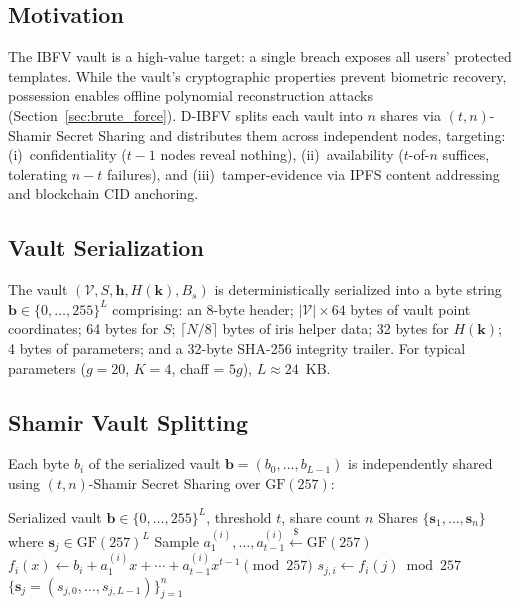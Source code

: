 \documentclass[3p,twocolumn]{elsarticle}
\newcommand{\IBFV}{\textsf{IBFV}}
\newcommand{\DIBFV}{\textsf{D-IBFV}}
\begin{document}
\subsection{Motivation}
\label{sec:decentral_motivation}

The \IBFV{} vault is a high-value target: a single breach exposes all users' protected templates. While the vault's cryptographic properties prevent biometric recovery, possession enables offline polynomial reconstruction attacks (Section~\ref{sec:brute_force}). \DIBFV{} splits each vault into $n$ shares via $(t,n)$-Shamir Secret Sharing and distributes them across independent nodes, targeting: (i)~confidentiality ($t{-}1$ nodes reveal nothing), (ii)~availability ($t$-of-$n$ suffices, tolerating $n{-}t$ failures), and (iii)~tamper-evidence via IPFS content addressing and blockchain CID anchoring.

\subsection{Vault Serialization}
\label{sec:vault_serial}

The vault $(\mathcal{V}, S, \mathbf{h}, H(\mathbf{k}), B_s)$ is deterministically serialized into a byte string $\mathbf{b} \in \{0,\ldots,255\}^L$ comprising: an 8-byte header; $|\mathcal{V}| \times 64$ bytes of vault point coordinates; 64 bytes for $S$; $\lceil N/8 \rceil$ bytes of iris helper data; 32 bytes for $H(\mathbf{k})$; 4 bytes of parameters; and a 32-byte SHA-256 integrity trailer. For typical parameters ($g = 20$, $K = 4$, chaff = $5g$), $L \approx 24$~KB.

\subsection{Shamir Vault Splitting}
\label{sec:shamir_split}

Each byte $b_i$ of the serialized vault $\mathbf{b} = (b_0, \ldots, b_{L-1})$ is independently shared using $(t,n)$-Shamir Secret Sharing over $\mathrm{GF}(257)$:

\begin{algorithm}[t]
\caption{\DIBFV{} Vault Splitting}
\label{alg:vault_split}
\begin{algorithmic}[1]
\REQUIRE Serialized vault $\mathbf{b} \in \{0,\ldots,255\}^L$, threshold $t$, share count $n$
\ENSURE Shares $\{\mathbf{s}_1, \ldots, \mathbf{s}_n\}$ where $\mathbf{s}_j \in \mathrm{GF}(257)^L$
    \STATE Sample $a_1^{(i)}, \ldots, a_{t-1}^{(i)} \stackrel{\$}{\leftarrow} \mathrm{GF}(257)$
    \STATE $f_i(x) \leftarrow b_i + a_1^{(i)} x + \cdots + a_{t-1}^{(i)} x^{t-1} \pmod{257}$
        \STATE $s_{j,i} \leftarrow f_i(j) \bmod 257$
    \ENDFOR
\ENDFOR
\RETURN $\{\mathbf{s}_j = (s_{j,0}, \ldots, s_{j,L-1})\}_{j=1}^{n}$
\end{algorithmic}
\end{algorithm}
\end{document}
